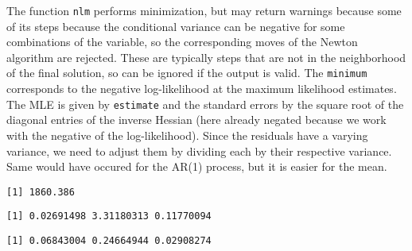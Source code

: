 \documentclass[]{book}
\newenvironment{Shaded}{\begin{snugshade}}{\end{snugshade}}
\newcommand{\KeywordTok}[1]{\textcolor[rgb]{0.13,0.29,0.53}{\textbf{#1}}}
\newcommand{\OperatorTok}[1]{\textcolor[rgb]{0.81,0.36,0.00}{\textbf{#1}}}
\newcommand{\NormalTok}[1]{#1}
\begin{document}
The function \texttt{nlm} performs minimization, but may return warnings
because some of its steps because the conditional variance can be
negative for some combinations of the variable, so the corresponding
moves of the Newton algorithm are rejected. These are typically steps
that are not in the neighborhood of the final solution, so can be
ignored if the output is valid. The \texttt{minimum} corresponds to the
negative log-likelihood at the maximum likelihood estimates. The MLE is
given by \texttt{estimate} and the standard errors by the square root of
the diagonal entries of the inverse Hessian (here already negated
because we work with the negative of the log-likelihood). Since the
residuals have a varying variance, we need to adjust them by dividing
each by their respective variance. Same would have occured for the AR(1)
process, but it is easier for the mean.

\begin{Shaded}
\end{Shaded}

\begin{verbatim}
[1] 1860.386
\end{verbatim}

\begin{Shaded}
\end{Shaded}

\begin{verbatim}
[1] 0.02691498 3.31180313 0.11770094
\end{verbatim}

\begin{Shaded}
\end{Shaded}

\begin{verbatim}
[1] 0.06843004 0.24664944 0.02908274
\end{verbatim}
\end{document}
